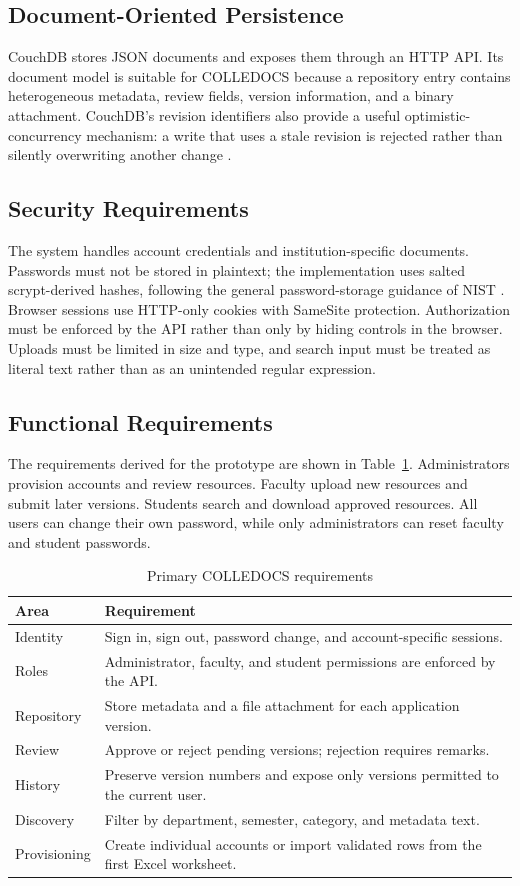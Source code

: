 \documentclass[conference]{IEEEtran}
\begin{document}
\subsection{Document-Oriented Persistence}
CouchDB stores JSON documents and exposes them through an HTTP API. Its document model is suitable for COLLEDOCS because a repository entry contains heterogeneous metadata, review fields, version information, and a binary attachment. CouchDB's revision identifiers also provide a useful optimistic-concurrency mechanism: a write that uses a stale revision is rejected rather than silently overwriting another change \cite{couchdb}.

\subsection{Security Requirements}
The system handles account credentials and institution-specific documents. Passwords must not be stored in plaintext; the implementation uses salted scrypt-derived hashes, following the general password-storage guidance of NIST \cite{nist}. Browser sessions use HTTP-only cookies with SameSite protection. Authorization must be enforced by the API rather than only by hiding controls in the browser. Uploads must be limited in size and type, and search input must be treated as literal text rather than as an unintended regular expression.

\subsection{Functional Requirements}
The requirements derived for the prototype are shown in Table~\ref{tab:req}. Administrators provision accounts and review resources. Faculty upload new resources and submit later versions. Students search and download approved resources. All users can change their own password, while only administrators can reset faculty and student passwords.

\begin{table}[t]
\caption{Primary COLLEDOCS requirements}
\label{tab:req}
\centering
\small
\begin{tabular}{p{} p{}}
\toprule
\textbf{Area} & \textbf{Requirement}\\
\midrule
Identity & Sign in, sign out, password change, and account-specific sessions.\\
Roles & Administrator, faculty, and student permissions are enforced by the API.\\
Repository & Store metadata and a file attachment for each application version.\\
Review & Approve or reject pending versions; rejection requires remarks.\\
History & Preserve version numbers and expose only versions permitted to the current user.\\
Discovery & Filter by department, semester, category, and metadata text.\\
Provisioning & Create individual accounts or import validated rows from the first Excel worksheet.\\
\bottomrule
\end{tabular}
\end{table}
\end{document}
